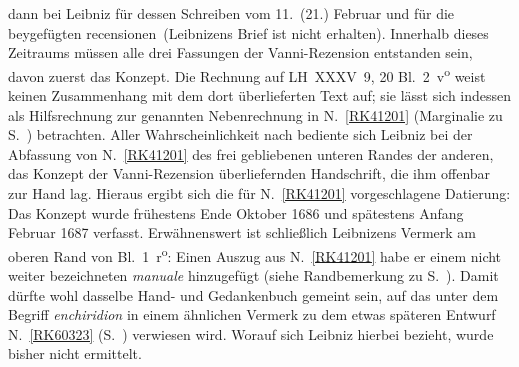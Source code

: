 \begin{ledgroup}
dann bei Leibniz für dessen Schreiben vom 11.~(21.) Februar und für die \glqq beygefügten \cite{02023}recensionen\grqq\ (Leibnizens Brief ist nicht erhalten).
Innerhalb dieses Zeitraums müssen alle drei Fassungen der Vanni-Rezension entstanden sein, davon zuerst das Konzept.
\pend
\pstart
Die Rechnung auf LH~XXXV~9, 20 Bl.~2~v\textsuperscript{o} weist keinen Zusammenhang mit dem dort überlieferten Text auf; sie lässt sich indessen als Hilfsrechnung zur genannten Nebenrechnung in N.~\ref{RK41201} %
(Marginalie zu S.~) betrachten.
Aller Wahrscheinlichkeit nach bediente sich Leibniz bei der Abfassung von N.~\ref{RK41201} %
des frei gebliebenen unteren Randes der anderen, das Konzept der Vanni-Rezension überliefernden Handschrift, die ihm offenbar zur Hand lag.
Hieraus ergibt sich die für N.~\ref{RK41201} %
vorgeschlagene Datierung:
Das Konzept wurde frühestens Ende Oktober 1686 und spätestens Anfang Februar 1687 verfasst.
\pend
\pstart
Erwähnenswert%
ist schließlich Leibnizens Vermerk am oberen Rand von Bl.~1~r\textsuperscript{o}:
Einen Auszug aus N.~\ref{RK41201} %
habe er einem nicht weiter bezeichneten \textit{manuale} hinzugefügt (siehe Randbemerkung zu S.~).
Damit dürfte wohl dasselbe Hand- und Gedankenbuch gemeint sein, auf das unter dem Begriff \textit{enchiridion} in einem ähnlichen Vermerk zu dem etwas späteren Entwurf N.~\ref{RK60323} (S.~) verwiesen wird.
Worauf sich Leibniz hierbei bezieht, wurde bisher nicht ermittelt.%
\pend%
\end{ledgroup}%
%
%
%
\frenchspacing%
%
%
\count{}%
\count{}%
\count{} 
\newpage%
\normalsize%
\pstart%
\noindent%
%
